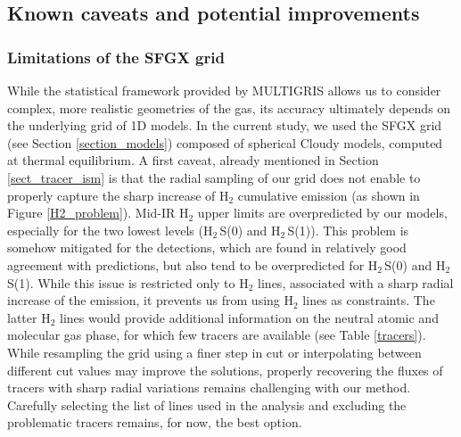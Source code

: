 \documentclass{aa}
\begin{document}



\subsection{Known caveats and potential improvements}
\label{discussion_limits}



\subsubsection{Limitations of the SFGX grid}

While the statistical framework provided by MULTIGRIS allows us to consider complex, more realistic geometries of the gas, its accuracy ultimately depends on the underlying grid of 1D models. In the current study, we used the SFGX grid (see Section \ref{section_models}) composed of spherical Cloudy models, computed at thermal equilibrium. A first caveat, already mentioned in Section \ref{sect_tracer_ism} is that the radial sampling of our grid does not enable to properly capture the sharp increase of H$_2$ cumulative emission (as shown in Figure \ref{H2_problem}). Mid-IR H$_2$ upper limits are overpredicted by our models, especially for the two lowest levels (H$_2$\,S(0) and H$_2$\,S(1)). This problem is somehow mitigated for the detections, which are found in relatively good agreement with predictions, but also tend to be overpredicted for H$_2$\,S(0) and H$_2$\,S(1). While this issue is restricted only to H$_2$ lines, associated with a sharp radial increase of the emission, it prevents us from using H$_2$ lines as constraints. The latter H$_2$ lines would provide additional information on the neutral atomic and molecular gas phase, for which few tracers are available (see Table \ref{tracers}). While resampling the grid using a finer step in cut or interpolating between different cut values may improve the solutions, properly recovering the fluxes of tracers with sharp radial variations remains challenging with our method. Carefully selecting the list of lines used in the analysis and excluding the problematic tracers remains, for now, the best option. 
\end{document}
